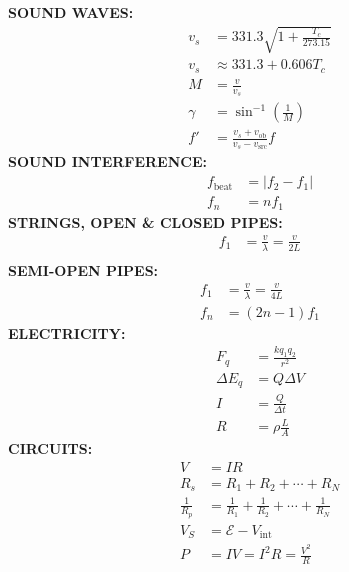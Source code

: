 \documentclass{../oss-handout}
\begin{document}
\begin{multicols*}{3}
  \textbf{SOUND WAVES:}
  \begin{align*}
    v_s &=331.3\sqrt{1+\frac{T_c}{273.15}}\\
    v_s &\approx 331.3 + 0.606T_c\\
    M&=\frac v{v_s}\\
    \gamma&=\sin^{-1}\left(\frac1M\right)\\
    f'&=\frac{v_s+v_\text{ob}}{v_s-v_\text{src}}f
  \end{align*}
%
%
  \textbf{SOUND INTERFERENCE:}
  \begin{align*}
    f_\text{beat}&=|f_2-f_1|\\
    f_n&=nf_1
  \end{align*}
  \textbf{STRINGS, OPEN \& CLOSED PIPES:}
  \begin{align*}
    f_1&=\frac v\lambda=\frac v{2L}\\
  \end{align*}
  \textbf{SEMI-OPEN PIPES:}
  \begin{align*}
    f_1&=\frac v\lambda=\frac v{4L}\\
    f_n&=(2n-1)f_1
  \end{align*}
%
  \textbf{ELECTRICITY:} %
  \begin{align*}
    F_q &= \frac{kq_1q_2}{r^2}\\
    \Delta E_q &= Q\Delta V\\
    I &= \frac Q{\Delta t}\\
    R &= \rho\frac LA
  \end{align*}
  \textbf{CIRCUITS:}
  \begin{align*}
    V &=IR \\
    R_s&=R_1 + R_2 + \cdots + R_N\\
    \frac1{R_p}&=\frac1{R_1}+\frac1{R_2}+\cdots+\frac1{R_N}\\
    V_S &= \mathcal E-V_\text{int}\\
    P &=IV=I^2R=\frac{V^2}R
  \end{align*}


\end{multicols*}
\end{document}
